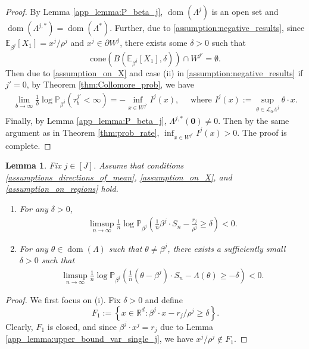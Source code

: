 \documentclass[aap,preprint]{imsart}
\newcommand{\Pro}{{\mathbb{P}}}
\newcommand{\Exp}{{\mathbb{E}}}
\newcommand{\bR}{{\mathbb{R}}}
\theoremstyle{plain}
\newtheorem{lemma}[theorem]{Lemma}
\theoremstyle{definition}
\begin{document}
\begin{appendix}
\begin{proof}
By Lemma \ref{app_lemma:P_beta_j}, $\operatorname{dom}(\Lambda^j)$ is an open set and $\operatorname{dom}(\Lambda^{j,*}) = \operatorname{dom}(\Lambda^{*})$. Further, due to \eqref{assumption:negative_results}, since $\Exp_{\beta^j}[X_1] = x^j/\rho^j$ and $x^j \in \partial W^j$, there exists some $\delta > 0$ such that
$$
\text{cone}(B(\Exp_{\beta^j}[X_1], \delta)) \cap W^{j'} = \emptyset.
$$
Then due to \eqref{assumption_on_X} and case (ii) in \eqref{assumption:negative_results} if $j' = 0$, by Theorem \ref{thm:Collomore_prob}, we have
\begin{align*}
   \lim_{b \to \infty} \frac{1}{b}  \log \Pro_{\beta^j}\left(\tau_b^{j'} < \infty\right) = - \inf_{x \in W^{j'}} I^j(x), \quad \text{ where } I^j(x) := \sup_{\theta \in \mathcal{L}_0 \Lambda^j} \theta \cdot x.
\end{align*} 
Finally, by Lemma \ref{app_lemma:P_beta_j}, $\Lambda^{j,*}(\mathbf{0}) \neq 0$. Then by the same argument as in Theorem \ref{thm:prob_rate}, $\inf_{x \in W^{j'}} I^j(x) > 0$. The proof is complete.
\end{proof}

\begin{lemma}\label{lemma:aux_prob34}
    Fix $j \in [J]$. 
    Assume that conditions \eqref{assumptions_directions_of_mean}, \eqref{assumption_on_X}, and \eqref{assumption_on_regions} hold.  
    \begin{enumerate}[label=(\roman*)]
        \item For any $\delta >0$,
        \begin{align*}
          \limsup_{n \to \infty} \frac{1}{n}  \log \Pro_{\beta^j}\left( \frac{1}{n}\beta^j \cdot S_n -\frac{r_j}{\rho^j} \geq \delta  \right) < 0.
        \end{align*}
        \item For any $\theta \in \operatorname{dom}(\Lambda)$ such that $\theta \neq \beta^j$, there exists a sufficiently small $\delta > 0$ such that
        \begin{align*}
          \limsup_{n \to \infty} \frac{1}{n}  \log \Pro_{\beta^j}\left( \frac{1}{n}(\theta -\beta^j) \cdot S_n -\Lambda(\theta) \geq -\delta  \right) < 0.
        \end{align*}      
    \end{enumerate}
\end{lemma}
\begin{proof}
We first focus on (i). Fix $\delta > 0$ and define
$$
F_1 := \left\{x \in \bR^d: \beta^j \cdot x - r_j/\rho^j \geq \delta \right\}.
$$
Clearly, $F_1$ is closed, and since $\beta^j \cdot x^j = r_j$ due to Lemma \ref{app_lemma:upper_bound_var_single_j}, we have $x^j/\rho^j \not \in F_1$.


\end{proof}
\end{appendix}
\end{document}
